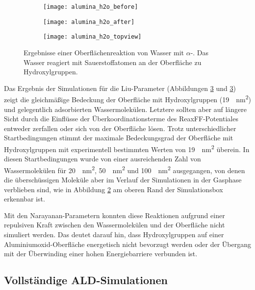 \begin{figure}
  \captionsetup[subfigure]{singlelinecheck=false}
  \def\subfigwidth{0.32\textwidth}
  \begin{subfigure}[t]{\subfigwidth}
    \texttt{[image: alumina\_h2o\_before]}
    \label{fig:wateraluminasurface-a}
  \end{subfigure}
  \hfill
  \begin{subfigure}[t]{\subfigwidth}
    \texttt{[image: alumina\_h2o\_after]}
    \label{fig:wateraluminasurface-b}
  \end{subfigure}
  \hfill
  \begin{subfigure}[t]{\subfigwidth}
    \texttt{[image: alumina\_h2o\_topview]}
    \label{fig:wateraluminasurface-c}
  \end{subfigure}
  \caption[Oberflächenreaktion von Wasser mit $\alpha$-]{Ergebnisse einer Oberflächenreaktion von Wasser mit $\alpha$-.
    Das Wasser reagiert mit Sauerstoffatomen an der Oberfläche zu Hydroxylgruppen.
  }
  \label{fig:wateraluminasurface}
\end{figure}

Das Ergebnis der Simulationen für die Liu-Parameter (Abbildungen \ref{fig:wateraluminasurface-c} und \ref{fig:wateraluminasurface-c}) zeigt die gleichmäßige Bedeckung der Oberfläche mit Hydroxylgruppen (\SI{19}{\per\square\nano\meter}) und gelegentlich adsorbierten Wassermolekülen.
Letztere sollten aber auf längere Sicht durch die Einflüsse der Überkoordinationsterme des ReaxFF-Potentiales entweder zerfallen oder sich von der Oberfläche lösen.
Trotz unterschiedlicher Startbedingungen stimmt der maximale Bedeckungsgrad der Oberfläche mit Hydroxylgruppen mit experimentell bestimmten Werten von \SI{19}{\per\square\nano\meter} überein.
In diesen Startbedingungen wurde von einer ausreichenden Zahl von Wassermolekülen für \SI{20}{\per\square\nano\meter}, \SI{50}{\per\square\nano\meter} und \SI{100}{\per\square\nano\meter} ausgegangen, von denen die überschüssigen Moleküle aber im Verlauf der Simulationen in der Gasphase verblieben sind, wie in Abbildung \ref{fig:wateraluminasurface-b} am oberen Rand der Simulationsbox erkennbar ist.

Mit den Narayanan-Parametern konnten diese Reaktionen aufgrund einer repulsiven Kraft zwischen den Wassermolekülen und der Oberfläche nicht simuliert werden.
Das deutet darauf hin, dass Hydroxylgruppen auf einer Aluminiumoxid-Oberfläche energetisch nicht bevorzugt werden oder der Übergang mit der Überwinding einer hohen Energiebarriere verbunden ist.

\subsection{Vollständige ALD-Simulationen}

